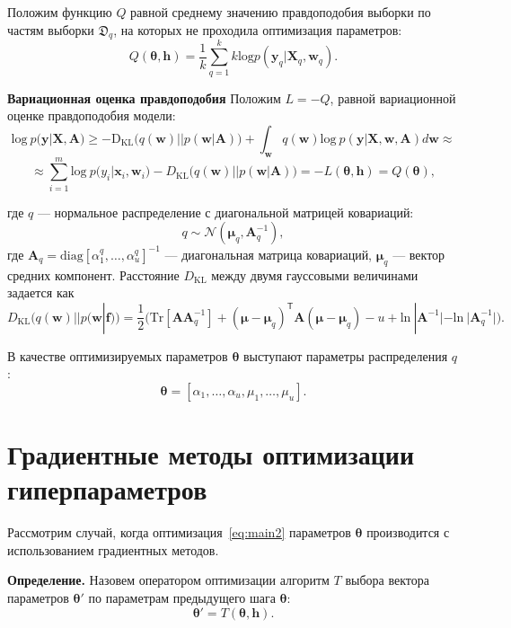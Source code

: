 Положим функцию $Q$ равной среднему значению правдоподобия выборки по частям выборки $\mathfrak{D}_q$, на которых не проходила оптимизация параметров:
\[
Q(\boldsymbol{\theta}, \mathbf{h}) = \frac{1}{k}\sum_{q=1}^k k\text{log}p(\mathbf{y}_q|\mathbf{X}_q, \mathbf{w}_q).
\]

\textbf{Вариационная оценка правдоподобия}
Положим $L=-Q$, равной вариационной оценке правдоподобия модели:
\begin{equation} 
\label{eq:elbo}
\text{log}~p(\mathbf{y}|\mathbf{X},\mathbf{A})  
\geq 
-\text{D}_\text{KL} \bigl(q(\mathbf{w})||p(\mathbf{w}|\mathbf{A})\bigr) + \int_{\mathbf{w}} q(\mathbf{w})\text{log}~{p(\mathbf{y}|\mathbf{X},\mathbf{w},\mathbf{A})} d \mathbf{w}  \approx
\end{equation}
\[
\approx \sum_{i=1}^m \text{log}~p({y}_i|\mathbf{x}_i, \mathbf{w}_i) - D_\text{KL}\bigl(q (\mathbf{w}) || p (\mathbf{w}|\mathbf{A})\bigr) = -L(\boldsymbol{\theta}, \mathbf{h}) = Q(\boldsymbol{\theta}),
\]

где $q$ --- нормальное распределение с диагональной матрицей ковариаций:
\begin{equation}
\label{eq:diag}
	q \sim \mathcal{N}(\boldsymbol{\mu}_q, \mathbf{A}^{-1}_q),
\end{equation}
где $\mathbf{A}_q = \text{diag}[\alpha^q_1, \dots, \alpha^q_u]^{-1}$ --- диагональная матрица ковариаций, $\boldsymbol{\mu}_q$ --- вектор средних компонент.
Расстояние $D_\text{KL}$ между двумя гауссовыми величинами задается как 
\[
	D_\text{KL}\bigl(q (\mathbf{w}) || p (\mathbf{w}|\mathbf{f})\bigr) = \frac{1}{2} \bigl( \text{Tr} [\mathbf{A}\mathbf{A}^{-1}_q] + (\boldsymbol{\mu} - \boldsymbol{\mu}_q)^\mathsf{T}\mathbf{A}(\boldsymbol{\mu} - \boldsymbol{\mu}_q) - u +\text{ln}~|\mathbf{A}^{-1}| - \text{ln}~|\mathbf{A}_q^{-1}| \bigr).
\]

В качестве оптимизируемых параметров $\boldsymbol{\theta}$ выступают параметры распределения $q$:
\[
\boldsymbol{\theta} = [\alpha_1, \dots, \alpha_u, {\mu}_1,\dots,{\mu}_u].
\]




\section{Градиентные методы оптимизации гиперпараметров}
Рассмотрим случай, когда оптимизация~\eqref{eq:main2} параметров $\boldsymbol{\theta}$ производится с использованием градиентных методов. 

\textbf{Определение.} Назовем оператором оптимизации алгоритм $T$ выбора вектора параметров $\boldsymbol{\theta}'$  по параметрам предыдущего шага $\boldsymbol{\theta}$:
\[
	\boldsymbol{\theta}' = T(\boldsymbol{\theta}, \mathbf{h}).
\]

